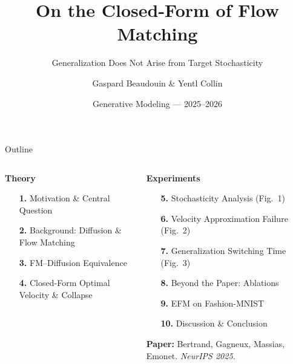 \documentclass[10pt,aspectratio=169]{beamer}
\begin{document}
\title{On the Closed-Form of Flow Matching}
\subtitle{Generalization Does Not Arise from Target Stochasticity}
\author{Gaspard Beaudouin \quad \& \quad Yentl Collin}
\date{Generative Modeling --- 2025--2026}

{
\begin{frame}[plain]
\end{frame}}
\addtocounter{framenumber}{-1}

\begin{frame}{Outline}
  \begin{columns}[t]
    \begin{column}{0.46\textwidth}
      \textcolor{TitleColor}{\textbf{\large Theory}}
      \bigskip

      \begin{enumerate}
        \item[\textcolor{AccentColor}{\bfseries 1.}] Motivation \& Central Question
        \item[\textcolor{AccentColor}{\bfseries 2.}] Background: Diffusion \& Flow Matching
        \item[\textcolor{AccentColor}{\bfseries 3.}] FM--Diffusion Equivalence
        \item[\textcolor{AccentColor}{\bfseries 4.}] Closed-Form Optimal Velocity \& Collapse
      \end{enumerate}
    \end{column}
    \begin{column}{0.50\textwidth}
      \textcolor{TitleColor}{\textbf{\large Experiments}}
      \bigskip

      \begin{enumerate}
        \item[\textcolor{AccentColor}{\bfseries 5.}] Stochasticity Analysis (Fig.~1)
        \item[\textcolor{AccentColor}{\bfseries 6.}] Velocity Approximation Failure (Fig.~2)
        \item[\textcolor{AccentColor}{\bfseries 7.}] Generalization Switching Time (Fig.~3)
        \item[\textcolor{AccentColor}{\bfseries 8.}] Beyond the Paper: Ablations
        \item[\textcolor{AccentColor}{\bfseries 9.}] EFM on Fashion-MNIST
        \item[\textcolor{AccentColor}{\bfseries 10.}] Discussion \& Conclusion
      \end{enumerate}
      \vspace{0.6em}
      \begin{hlbox}
        \small\textbf{Paper:} Bertrand, Gagneux, Massias, Emonet.
        \textit{NeurIPS 2025.}
      \end{hlbox}
    \end{column}
  \end{columns}
\end{frame}
\end{document}
